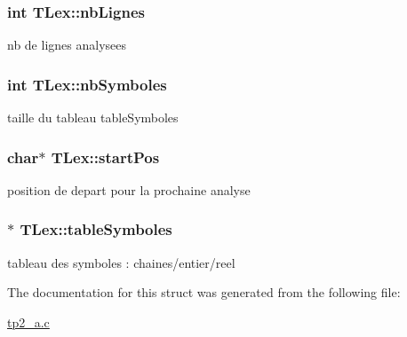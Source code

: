 \subsubsection[{\texorpdfstring{nb\+Lignes}{nbLignes}}]{\setlength{\rightskip}{0pt plus 5cm}int T\+Lex\+::nb\+Lignes}\hypertarget{structTLex_a74499b75b25dc1bce1fb2f66af6ce1e2}{}\label{structTLex_a74499b75b25dc1bce1fb2f66af6ce1e2}
nb de lignes analysees 
\subsubsection[{\texorpdfstring{nb\+Symboles}{nbSymboles}}]{\setlength{\rightskip}{0pt plus 5cm}int T\+Lex\+::nb\+Symboles}\hypertarget{structTLex_a84d0d3a30f4b42f8db675f8cbb60373f}{}\label{structTLex_a84d0d3a30f4b42f8db675f8cbb60373f}
taille du tableau table\+Symboles 
\subsubsection[{\texorpdfstring{start\+Pos}{startPos}}]{\setlength{\rightskip}{0pt plus 5cm}char$\ast$ T\+Lex\+::start\+Pos}\hypertarget{structTLex_a1122e1ced17c2c07f7975b4f11110ad8}{}\label{structTLex_a1122e1ced17c2c07f7975b4f11110ad8}
position de depart pour la prochaine analyse 
\subsubsection[{\texorpdfstring{table\+Symboles}{tableSymboles}}]{$\ast$ T\+Lex\+::table\+Symboles}\hypertarget{structTLex_a31a6c4fc0839643e3251a372ba7adf04}{}\label{structTLex_a31a6c4fc0839643e3251a372ba7adf04}
tableau des symboles \+: chaines/entier/reel 

The documentation for this struct was generated from the following file\+:\begin{DoxyCompactItemize}
\item 
\hyperlink{tp2__a_8c}{tp2\+\_\+a.\+c}\end{DoxyCompactItemize}
